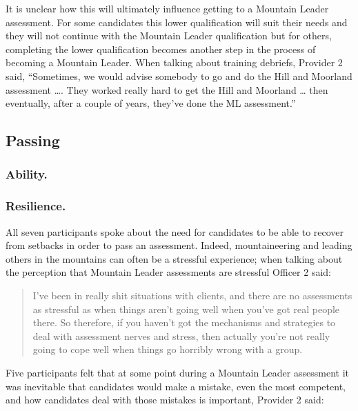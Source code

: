 \documentclass[
  12pt,
  a4paper,
]{book}
\begin{document}
It is unclear how this will ultimately influence getting to a Mountain Leader assessment. For some candidates this lower qualification will suit their needs and they will not continue with the Mountain Leader qualification but for others, completing the lower qualification becomes another step in the process of becoming a Mountain Leader. When talking about training debriefs, Provider 2 said, ``Sometimes, we would advise somebody to go and do the Hill and Moorland assessment \ldots. They worked really hard to get the Hill and Moorland \ldots{} then eventually, after a couple of years, they've done the ML assessment.''

\hypertarget{passing}{%
\subsection{Passing}\label{passing}}

\hypertarget{ability.}{%
\subsubsection{Ability.}\label{ability.}}

\hypertarget{qual-passing-resilience}{%
\subsubsection{Resilience.}\label{qual-passing-resilience}}

All seven participants spoke about the need for candidates to be able to recover from setbacks in order to pass an assessment. Indeed, mountaineering and leading others in the mountains can often be a stressful experience; when talking about the perception that Mountain Leader assessments are stressful Officer 2 said:

\begin{quote}
I've been in really shit situations with clients, and there are no assessments as stressful as when things aren't going well when you've got real people there. So therefore, if you haven't got the mechanisms and strategies to deal with assessment nerves and stress, then actually you're not really going to cope well when things go horribly wrong with a group.
\end{quote}

Five participants felt that at some point during a Mountain Leader assessment it was inevitable that candidates would make a mistake, even the most competent, and how candidates deal with those mistakes is important, Provider 2 said:
\end{document}
